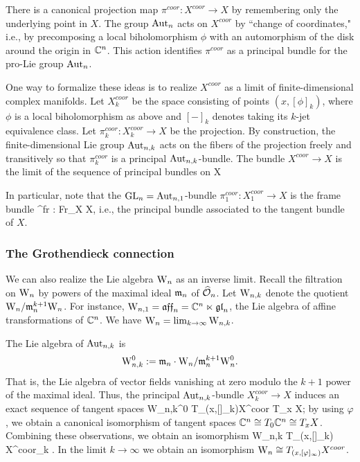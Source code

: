 \documentclass[10pt]{amsart}
\begin{document}
There is a canonical projection map $\pi^{coor} : X^{coor} \to X$ by remembering only the underlying point in $X$. 
The group ${\rm Aut}_n$ acts on $X^{coor}$ by ``change of coordinates," 
i.e., by precomposing a local biholomorphism $\phi$ with an automorphism of the disk around the origin in $\mathbb C^n$.
This action identifies $\pi^{coor}$ as a principal bundle for the pro-Lie group ${\rm Aut}_n$. 

One way to formalize these ideas is to realize $X^{coor}$ as a limit of finite-dimensional complex manifolds. 
Let $X_k^{coor}$ be the space consisting of points $(x, [\phi]_k)$, 
where $\phi$ is a local biholomorphism as above and $[-]_k$ denotes taking its $k$-jet equivalence class. 
Let $\pi_k^{coor} : X^{coor}_k \to X$ be the projection. 
By construction, the finite-dimensional Lie group ${\rm Aut}_{n,k}$ acts on the fibers of the projection freely and transitively 
so that $\pi_k^{coor}$ is a principal ${\rm Aut}_{n,k}$-bundle. The bundle $X^{coor} \to X$ is the limit of the sequence of principal bundles on X
\ben
{}
\een

In particular, note that the ${\rm GL}_n = {\rm Aut}_{n,1}$-bundle $\pi_1^{coor} : X^{coor}_1 \to X$ is the frame bundle
\ben
\pi^{fr} : {\rm Fr}_X \to X,
\een
i.e., the principal bundle associated to the tangent bundle of $X$.

\subsubsection{The Grothendieck connection} 

We can also realize the Lie algebra ${{\rm W}_n}$ as an inverse limit. 
Recall the filtration on ${{\rm W}_n}$ by powers of the maximal ideal ${\mathfrak m}_n$ of $\widehat{\mathcal O}_n$. 
Let ${\rm W}_{n,k}$ denote the quotient ${{\rm W}_n} / {\mathfrak m}_n^{k+1} {{\rm W}_n}$. 
For instance, ${\rm W}_{n,1} = \mathfrak{aff}_n = \mathbb C^n \ltimes {\mathfrak{gl}}_n$, the Lie algebra of affine transformations of $\mathbb C^n$. We have ${{\rm W}_n} = \lim_{k \to \infty} {\rm W}_{n,k}$. 

The Lie algebra of ${\rm Aut}_{n,k}$ is
\[
{\rm W}_{n,k}^0 := {\mathfrak m}_n \cdot {{\rm W}_n} /{\mathfrak m}_n^{k+1} {{\rm W}^0_n} .
\]
That is, the Lie algebra of vector fields vanishing at zero modulo the $k+1$ power of the maximal ideal. Thus, the principal ${\rm Aut}_{n,k}$-bundle $X_{k}^{coor} \to X$ induces an exact sequence of tangent spaces
\ben
{\rm W}_{n,k}^0 \to T_{(x,[\varphi]_k)}X^{coor} \to T_x X;
\een
by using $\varphi$, we obtain a canonical isomorphism of tangent spaces $\mathbb C^n \cong T_0 \mathbb C^n \cong T_x X$. Combining these observations, we obtain an isomorphism
\ben
{\rm W}_{n,k} \cong T_{(x,[\varphi]_k)} X^{coor}_k .
\een
In the limit $k \to \infty$ we obtain an isomorphism ${{\rm W}_n} \cong T_{(x,[\varphi]_\infty)} X^{coor}$. 
\end{document}
